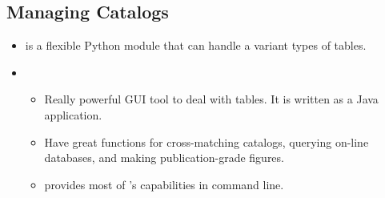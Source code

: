 \documentclass[letterpaper,10pt,english]{sphinxmanual}
\begin{document}
\subsection{Managing Catalogs}
\label{\detokenize{resource/astro/astro_research_basic:managing-catalogs}}\begin{itemize}
\item {} 
 is a
flexible Python module that can handle a variant types of tables.

\item {} 
\begin{itemize}
\item {} 
Really powerful GUI tool to deal with tables. It is written as a
Java application.

\item {} 
Have great functions for cross-matching catalogs, querying on-line
databases, and making publication-grade figures.

\item {} 
 provides most of
’s capabilities in command line.

\end{itemize}

\end{itemize}
\end{document}
